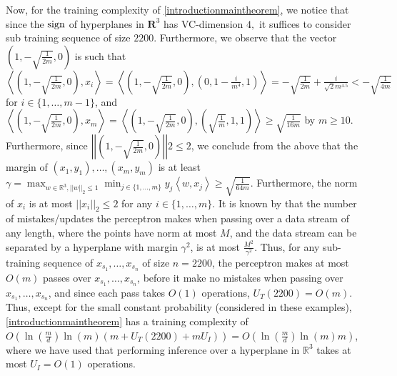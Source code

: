 Now, for the training complexity of \cref{introductionmaintheorem}, we notice that since the $ \operatorname{sign} $ of hyperplanes in $ \mathbf{R}^{3} $  has VC-dimension $ 4,$ it suffices to consider sub training sequence of size $ 2200.$  Furthermore,  we observe that the vector $(1, -\sqrt{\frac{1}{2m}},0)$ is such that $\left\langle (1, -\sqrt{\frac{1}{2m}},0), x_{i} \right\rangle = \left\langle (1, -\sqrt{\frac{1}{2m}},0), (0,1-\frac{i}{m^{4}},1) \right\rangle = -\sqrt{\frac{1}{2m}} + \frac{i}{\sqrt{2}m^{4.5}} < -\sqrt{\frac{1}{4m}}$ for $i \in \{1, \ldots, m-1\}$, and $\left\langle (1, -\sqrt{\frac{1}{2m}},0), x_{m}\right\rangle = \left\langle (1, -\sqrt{\frac{1}{2m}},0), (\sqrt{\frac{1}{m}}, 1,1) \right\rangle \geq \sqrt{\frac{1}{16m}}$ by $m \geq 10.$ Furthermore, since $\left|\left|(1, -\sqrt{\frac{1}{2m}},0)\right|\right|{2} \leq 2$, we conclude from the above that the margin of $(x_{1}, y_{1}), \ldots, (x_{m}, y_{m})$ is at least $\gamma = \max_{w \in \mathbb{R}^{3}, \left|\left|w\right|\right|_{2} \leq 1} \min_{j \in \{1, \ldots, m\}} y_{j} \left\langle w, x_{j} \right\rangle \geq \sqrt{\frac{1}{64m}}$. Furthermore, the norm of $ x_{i} $ is at most  $\left|\left|x_{i}\right|\right|_{2} \leq 2$ for any $ i\in\{  1,\ldots,m\}  $. It is known by \cite{Novikoff1963ONCP} that the number of mistakes/updates the perceptron makes when passing over a data stream of any length, where the points have norm at most $M$, and the data stream can be separated by a hyperplane with margin $\gamma^{2}$, is at most $\frac{M^{2}}{\gamma^{2}}$. Thus, for any sub-training sequence of $x_{s_{1}}, \ldots, x_{s_{n}}$ of size $n = 2200$, the perceptron makes at most $O(m)$ passes over $x_{s_{1}}, \ldots, x_{s_{n}}$, before it make no mistakes when passing over $x_{s_{1}}, \ldots, x_{s_{n}}$, and since each pass takes $O(1)$ operations, $U_{T}(2200) = O(m)$. Thus, except for the small constant probability (considered in these examples), \cref{introductionmaintheorem} has a training complexity of $O\left(\ln{\left(\frac{m}{d}\right)} \ln{(m)} \left(m + U_{T}(2200) + mU_{I}\right)\right) = O\left(\ln{\left(\frac{m}{d}\right)} \ln{(m)} m\right)$, where we have used that performing inference over a hyperplane in $\mathbb{R}^{3}$ takes at most $U_{I} = O(1)$ operations.